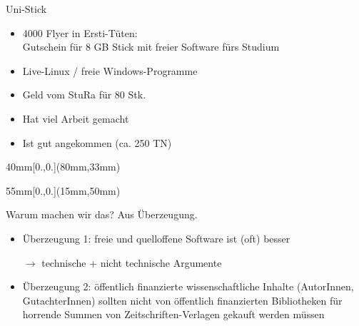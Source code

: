 \documentclass[t]{beamer}
\begin{document}
\begin{frame}[label=ct1b]{\color{fg} Uni-Stick}

\vspace{-5mm}
\begin{itemize}
 \item 4000 Flyer in Ersti-Tüten:\\
 Gutschein für 8 GB Stick mit freier Software fürs Studium
 \item Live-Linux / freie Windows-Programme
 \item Geld vom StuRa für 80 Stk.
 \pause
 \item Hat viel Arbeit gemacht  
 \pause
 \item Ist gut angekommen (ca. 250 TN) 
\end{itemize}

\begin{textblock*}{40mm}[0.,0.](80mm,33mm)
\end{textblock*}

\begin{textblock*}{55mm}[0.,0.](15mm,50mm)
\end{textblock*}

 
\end{frame}



\begin{frame}[label=ct2]{\color{fg}Warum machen wir das? Aus Überzeugung.}
~\\[6mm]
  \begin{itemize}
  \item Überzeugung 1: freie und quelloffene Software ist (oft) besser
  \item[$\rightarrow$] technische + nicht technische Argumente\\[8mm]
  \pause
  \item Überzeugung 2: öffentlich finanzierte wissenschaftliche Inhalte
  (AutorInnen, GutachterInnen) sollten nicht von öffentlich finanzierten
  Bibliotheken für horrende Summen von Zeitschriften-Verlagen gekauft werden müssen
  \end{itemize}  
\end{frame}
\end{document}
